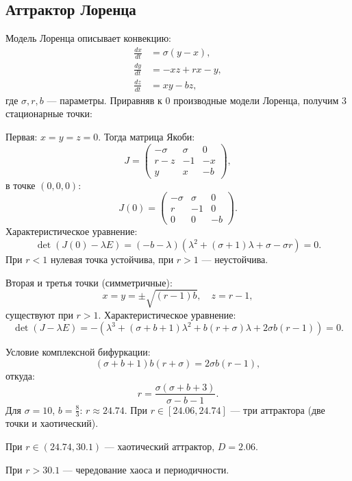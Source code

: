 	\subsection{Аттрактор Лоренца}
	
	Модель Лоренца описывает конвекцию:
	\begin{align}
		\frac{d x}{d t} &= \sigma (y - x), \\
		\frac{d y}{d t} &= -x z + r x - y, \\
		\frac{d z}{d t} &= x y - b z,
	\end{align}
	где $\sigma, r, b$ — параметры.
	\newpage
	Приравняв к 0 производные модели Лоренца, получим 3 стационарные точки:
	\par
	Первая: $x = y = z = 0$. Тогда матрица Якоби:
	\begin{equation}
		J = \begin{pmatrix}
			-\sigma & \sigma & 0 \\
			r - z & -1 & -x \\
			y & x & -b
		\end{pmatrix},
	\end{equation}
	в точке $(0,0,0)$:
	\begin{equation}
		J(0) = \begin{pmatrix}
			-\sigma & \sigma & 0 \\
			r & -1 & 0 \\
			0 & 0 & -b
		\end{pmatrix}.
	\end{equation}
	Характеристическое уравнение:
	\begin{equation}
		\det(J(0) - \lambda E) = (-b - \lambda) \left( \lambda^2 + (\sigma + 1) \lambda + \sigma - \sigma r \right) = 0.
	\end{equation}
	При $r < 1$ нулевая точка устойчива, при $r > 1$ — неустойчива.
	
	Вторая и третья точки (симметричные):
	\begin{equation}
		x = y = \pm \sqrt{(r - 1) b}, \quad z = r - 1,
	\end{equation}
	существуют при $r > 1$. Характеристическое уравнение:
	\begin{equation}
		\det(J - \lambda E) = -\left( \lambda^3 + (\sigma + b + 1) \lambda^2 + b (r + \sigma) \lambda + 2 \sigma b (r - 1) \right) = 0.
	\end{equation}
	
	Условие комплексной бифуркации:
	\begin{equation}
		(\sigma + b + 1) b (r + \sigma) = 2 \sigma b (r - 1),
	\end{equation}
	откуда:
	\begin{equation}
		r = \frac{\sigma (\sigma + b + 3)}{\sigma - b - 1}.
	\end{equation}
	Для $\sigma = 10$, $b = \frac{8}{3}$: $r \approx 24.74$.
	При $r \in [24.06, 24.74]$ — три аттрактора (две точки и хаотический).
	\par
	При $r \in (24.74, 30.1)$ — хаотический аттрактор, $D = 2.06$. 
	\par
	При $r > 30.1$ — чередование хаоса и периодичности.
	
